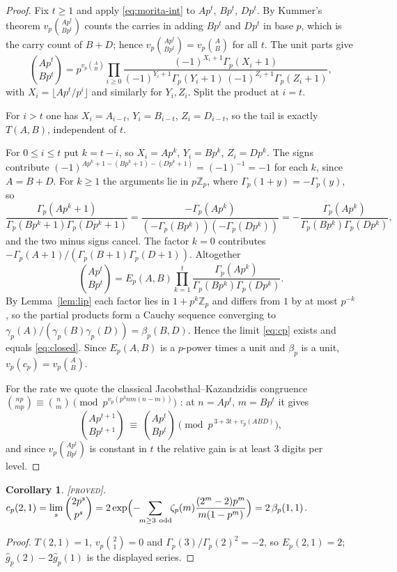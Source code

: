 \documentclass[11pt,reqno]{article}
\newcommand{\Zp}{\mathbb{Z}_p}
\newcommand{\Gp}{\Gamma_p}
\newcommand{\gtow}{\gamma_p}
\newcommand{\gh}{\widehat{g}_p}
\newcommand{\bet}{\beta_p}
\newcommand{\vp}{v_p}
\newcommand{\bin}[2]{\binom{#1}{#2}}
\newcommand{\floor}[1]{\lfloor #1 \rfloor}
\newcommand{\PROVED}{{\normalfont\textsc{[proved]}}}
\theoremstyle{plain}
\newtheorem{corollary}[theorem]{Corollary}
\theoremstyle{definition}
\theoremstyle{remark}
\numberwithin{equation}{section}
\begin{document}
\begin{proof}
Fix $t\ge1$ and apply \eqref{eq:morita-int} to $Ap^t$, $Bp^t$, $Dp^t$.  By
Kummer's theorem $\vp\bin{Ap^t}{Bp^t}$ counts the carries in adding $Bp^t$ and
$Dp^t$ in base $p$, which is the carry count of $B+D$; hence
$\vp\bin{Ap^t}{Bp^t}=\vp\bin{A}{B}$ for all $t$.  The unit parts give
\[
  \bin{Ap^t}{Bp^t}
  = p^{\vp\binom{A}{B}}\prod_{i\ge0}
     \frac{(-1)^{X_i+1}\Gp(X_i+1)}
          {(-1)^{Y_i+1}\Gp(Y_i+1)\,(-1)^{Z_i+1}\Gp(Z_i+1)},
\]
with $X_i=\floor{Ap^t/p^i}$ and similarly for $Y_i,Z_i$.  Split the product at
$i=t$.

For $i>t$ one has $X_i=A_{i-t}$, $Y_i=B_{i-t}$, $Z_i=D_{i-t}$, so the tail is
exactly $T(A,B)$, independent of $t$.

For $0\le i\le t$ put $k=t-i$, so $X_i=Ap^{k}$, $Y_i=Bp^k$, $Z_i=Dp^k$.  The
signs contribute $(-1)^{Ap^k+1-(Bp^k+1)-(Dp^k+1)}=(-1)^{-1}=-1$ for each $k$,
since $A=B+D$.  For $k\ge1$ the arguments lie in $p\Zp$, where
$\Gp(1+y)=-\Gp(y)$, so
\[
  \frac{\Gp(Ap^k+1)}{\Gp(Bp^k+1)\Gp(Dp^k+1)}
  =\frac{-\Gp(Ap^k)}{(-\Gp(Bp^k))(-\Gp(Dp^k))}
  =-\frac{\Gp(Ap^k)}{\Gp(Bp^k)\Gp(Dp^k)},
\]
and the two minus signs cancel.  The factor $k=0$ contributes
$-\Gp(A+1)/(\Gp(B+1)\Gp(D+1))$.  Altogether
\begin{equation}\label{eq:finite-t}
  \bin{Ap^t}{Bp^t}
  = E_p(A,B)\prod_{k=1}^{t}\frac{\Gp(Ap^k)}{\Gp(Bp^k)\Gp(Dp^k)} .
\end{equation}
By Lemma~\ref{lem:lip} each factor lies in $1+p^k\Zp$ and differs from $1$ by at
most $p^{-k}$, so the partial products form a Cauchy sequence converging to
$\gtow(A)/(\gtow(B)\gtow(D))=\bet(B,D)$.  Hence the limit \eqref{eq:cp} exists
and equals \eqref{eq:closed}.  Since $E_p(A,B)$ is a $p$-power times a unit and
$\bet$ is a unit, $\vp(c_p)=\vp\bin{A}{B}$.

For the rate we quote the classical Jacobsthal--Kazandzidis congruence
$\bin{np}{mp}\equiv\bin nm \pmod{p^{\vp(p^3nm(n-m))}}$
\cite{JacobsthalKazandzidis,Mestrovic}: at $n=Ap^t$, $m=Bp^t$ it gives
\[
  \bin{Ap^{t+1}}{Bp^{t+1}}\ \equiv\ \bin{Ap^{t}}{Bp^{t}}
  \pmod{p^{\,3+3t+\vp(ABD)}},
\]
and since $\vp\bin{Ap^t}{Bp^t}$ is constant in $t$ the relative gain is at least
$3$ digits per level.
\end{proof}

\begin{corollary}\label{cor:cp21}
\PROVED.  $\displaystyle c_p(2,1)=\lim_s\bin{2p^s}{p^s}
=2\exp\Bigl(-\!\!\sum_{m\ge3\ \mathrm{odd}}\!\!\zeta_p(m)\frac{(2^m-2)p^m}{m(1-p^m)}\Bigr)
=2\,\bet(1,1)$.
\end{corollary}
\begin{proof}
$T(2,1)=1$, $\vp\bin21=0$ and $\Gp(3)/\Gp(2)^2=-2$, so $E_p(2,1)=2$;
$\gh(2)-2\gh(1)$ is the displayed series.
\end{proof}
\end{document}
